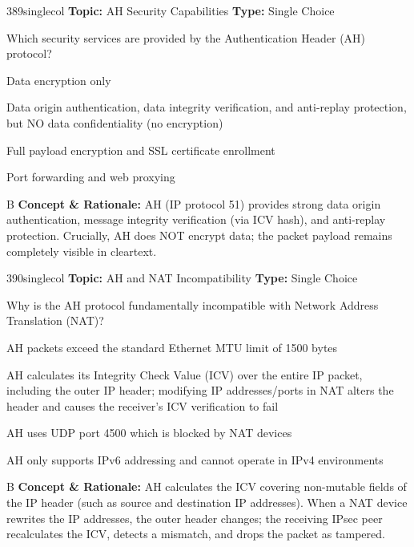 \begin{qcard}{389}{singlecol}
\textcolor{darkslate!75}{\small\textbf{Topic:} AH Security Capabilities \hfill \textbf{Type:} Single Choice}\vspace{0.4em}\par
Which security services are provided by the Authentication Header (AH) protocol?
\begin{qoptions}
\item Data encryption only
\item Data origin authentication, data integrity verification, and anti-replay protection, but NO data confidentiality (no encryption)
\item Full payload encryption and SSL certificate enrollment
\item Port forwarding and web proxying
\end{qoptions}
\end{qcard}
\nopagebreak
\begin{explainbox}{B}
\textbf{Concept \& Rationale:} AH (IP protocol 51) provides strong data origin authentication, message integrity verification (via ICV hash), and anti-replay protection. Crucially, AH does NOT encrypt data; the packet payload remains completely visible in cleartext.
\end{explainbox}

\begin{qcard}{390}{singlecol}
\textcolor{darkslate!75}{\small\textbf{Topic:} AH and NAT Incompatibility \hfill \textbf{Type:} Single Choice}\vspace{0.4em}\par
Why is the AH protocol fundamentally incompatible with Network Address Translation (NAT)?
\begin{qoptions}
\item AH packets exceed the standard Ethernet MTU limit of 1500 bytes
\item AH calculates its Integrity Check Value (ICV) over the entire IP packet, including the outer IP header; modifying IP addresses/ports in NAT alters the header and causes the receiver's ICV verification to fail
\item AH uses UDP port 4500 which is blocked by NAT devices
\item AH only supports IPv6 addressing and cannot operate in IPv4 environments
\end{qoptions}
\end{qcard}
\nopagebreak
\begin{explainbox}{B}
\textbf{Concept \& Rationale:} AH calculates the ICV covering non-mutable fields of the IP header (such as source and destination IP addresses). When a NAT device rewrites the IP addresses, the outer header changes; the receiving IPsec peer recalculates the ICV, detects a mismatch, and drops the packet as tampered.
\end{explainbox}

